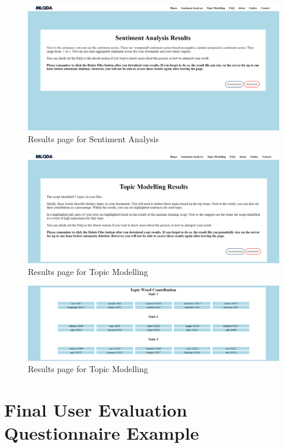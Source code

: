 \documentclass{l4proj}
\begin{document}
\begin{appendices}
\begin{figure}[H]
    \centering
    \includegraphics[width=0.95\linewidth]{images/sa_results.png}
    \caption{Results page for Sentiment Analysis}
    \label{fig:sa_results} 
\end{figure}

\begin{figure}[H]
    \centering
    \includegraphics[width=0.95\linewidth]{images/tm_results_1.png}
    \caption{Results page for Topic Modelling}
    \label{fig:tm_results_1} 
\end{figure}

\begin{figure}[H]
    \centering
    \includegraphics[width=0.95\linewidth]{images/tm_results_2.png}
    \caption{Results page for Topic Modelling}
    \label{fig:tm_results_2} 
\end{figure}


 \chapter{Final User Evaluation Questionnaire Example}
 \label{appendix:user_eval}

\end{appendices}
\end{document}

